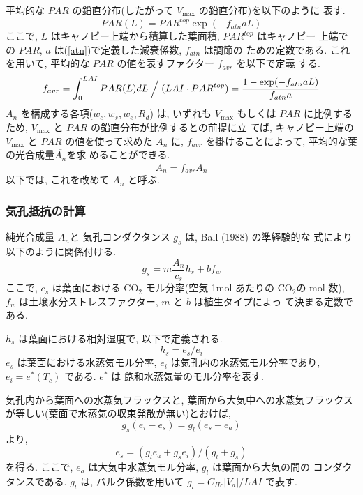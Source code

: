 平均的な $PAR$ の鉛直分布(したがって $V_{\max}$ の鉛直分布)を以下のように
表す.
\begin{equation}
 PAR(L) = PAR^{top} \exp(- f_{atn} a L)
\end{equation}
ここで, $L$ はキャノピー上端から積算した葉面積, $PAR^{top}$ はキャノピー
上端での $PAR$, $a$ は(\ref{atn})で定義した減衰係数, $f_{atn}$ は調節の
ための定数である.
これを用いて, 平均的な $PAR$ の値を表すファクター $f_{avr}$ を以下で定義
する.
\begin{equation}
 f_{avr} = \int_0^{LAI} PAR(L) dL \Bigm / (LAI \cdot PAR^{top})
 = \frac{1 - \exp(- f_{atn} a L)}{f_{atn} a}
\end{equation}
$A_n$ を構成する各項($w_c, w_s, w_e, R_d$) は, いずれも $V_{\max}$ もしくは
$PAR$ に比例するため, $V_{\max}$ と $PAR$ の鉛直分布が比例するとの前提に立
てば, キャノピー上端の $V_{\max}$ と $PAR$ の値を使って求めた $A_n$ に,
$f_{avr}$ を掛けることによって, 平均的な葉の光合成量$\overline{A_n}$を求
めることができる.
\begin{equation}
 \overline{A_n} = f_{avr} A_n
\end{equation}
以下では, これを改めて $A_n$ と呼ぶ.

\subsubsection{気孔抵抗の計算}

純光合成量 $A_n$と 気孔コンダクタンス $g_s$ は, Ball (1988) の準経験的な
式により以下のように関係付ける.
\begin{equation}
 g_s = m \frac {A_n}{c_s} h_s + b f_w
\label{photo_gs}
\end{equation}
ここで, $c_s$ は葉面における CO$_2$ モル分率(空気 1mol あたりの CO$_2$の
mol 数), $f_w$ は土壌水分ストレスファクター, $m$ と $b$ は植生タイプによっ
て決まる定数である.

$h_s$ は葉面における相対湿度で, 以下で定義される.
\begin{equation}
 h_s = e_s / e_i
\label{photo_h}
\end{equation}
$e_s$ は葉面における水蒸気モル分率,
$e_i$ は気孔内の水蒸気モル分率であり, $e_i = e^*(T_c)$ である. $e^*$ は
飽和水蒸気量のモル分率を表す.

気孔内から葉面への水蒸気フラックスと, 葉面から大気中への水蒸気フラックス
が等しい(葉面で水蒸気の収束発散が無い)とおけば,
\begin{equation}
 g_s(e_i - e_s) = g_l(e_s - e_a)
\label{photo_esei}
\end{equation}
より,
\begin{equation}
 e_s = ( g_l e_a + g_s e_i ) / ( g_l + g_s )
\label{photo_es}
\end{equation}
を得る. ここで, $e_a$ は大気中水蒸気モル分率, $g_l$ は葉面から大気の間の
コンダクタンスである. $g_l$ は, バルク係数を用いて $g_l = C_{Hc}|V_a| /
LAI$ で表す.

